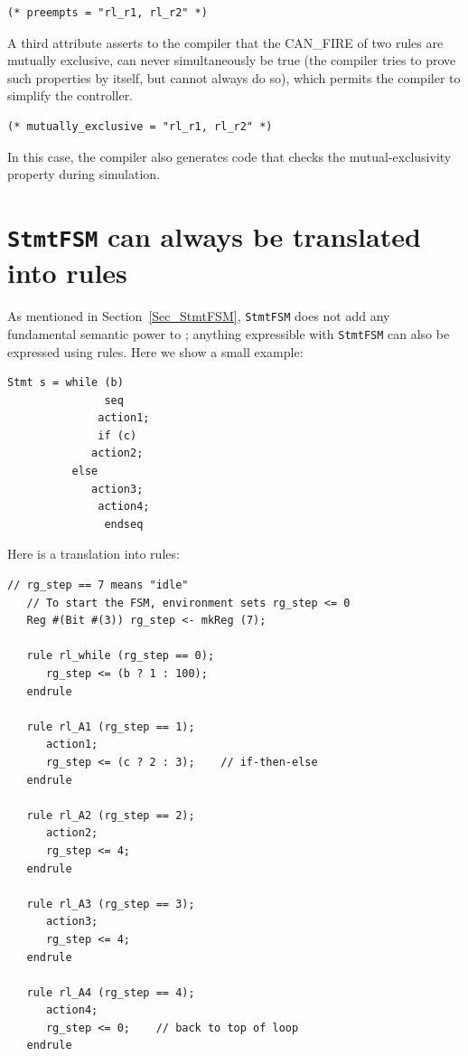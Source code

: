 {\footnotesize
\begin{Verbatim}[frame=single,label=BSV]
(* preempts = "rl_r1, rl_r2" *)
\end{Verbatim}
}

A third attribute asserts to the compiler that the CAN\_FIRE of two
rules are mutually exclusive, {\ie} can never simultaneously be true
(the compiler tries to prove such properties by itself, but cannot
always do so), which permits the compiler to simplify the controller.

{\footnotesize
\begin{Verbatim}[frame=single,label=BSV]
(* mutually_exclusive = "rl_r1, rl_r2" *)
\end{Verbatim}
}

In this case, the compiler also generates code that checks the
mutual-exclusivity property during simulation.


\section{{\tt StmtFSM} can always be translated into rules}

\label{Sec_StmtFSM_translation_into_rules}


As mentioned in Section~\ref{Sec_StmtFSM}, \verb|StmtFSM| does not add
any fundamental semantic power to {\BSV}; anything expressible with
\verb|StmtFSM| can also be expressed using rules.  
Here we show a small example:

{\footnotesize
\begin{Verbatim}[frame=single,label=BSV]
   Stmt s = while (b)
               seq
	          action1;
	          if (c)
		     action2;
		  else
		     action3;
	          action4;
               endseq
\end{Verbatim}
}

Here is a translation into rules:

{\footnotesize
\begin{Verbatim}[frame=single,label=BSV]
   // rg_step == 7 means "idle"
   // To start the FSM, environment sets rg_step <= 0
   Reg #(Bit #(3)) rg_step <- mkReg (7);

   rule rl_while (rg_step == 0);
      rg_step <= (b ? 1 : 100);
   endrule

   rule rl_A1 (rg_step == 1);
      action1;
      rg_step <= (c ? 2 : 3);    // if-then-else
   endrule

   rule rl_A2 (rg_step == 2);
      action2;
      rg_step <= 4;
   endrule

   rule rl_A3 (rg_step == 3);
      action3;
      rg_step <= 4;
   endrule

   rule rl_A4 (rg_step == 4);
      action4;
      rg_step <= 0;    // back to top of loop
   endrule
\end{Verbatim}
}

